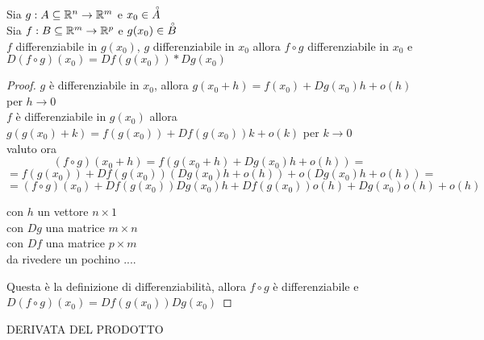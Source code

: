 \begin{proposition}
	\label{prop:deriv_funz_comp}
	Sia $g: A\subseteq \mathbb{R}^n \to \mathbb{R}^m$ e $x_0\in\accentset{\circ}{A}$\\
	Sia $f: B\subseteq \mathbb{R}^m \to \mathbb{R}^p$ e $g(x_0)\in\accentset{\circ}{B}$\\
	$f$ differenziabile in $g(x_0)$, $g$ differenziabile in $x_0$ allora $f\circ g$ differenziabile in $x_0$ e $D(f\circ g)(x_0) = Df(g(x_0))*Dg(x_0)$
	\begin{proof}
		$g$ è differenziabile in $x_0$, allora $g(x_0+h)=f(x_0)+Dg(x_0)h+o(h)$ per $h \to 0$\\
		$f$ è differenziabile in $g(x_0)$ allora $g(g(x_0)+k)=f(g(x_0))+Df(g(x_0))k+o(k)$ per $k \to 0$\\
		valuto ora
		\[(f\circ g)(x_0+h) = f(g(x_0+h)+Dg(x_0)h+o(h)) = \]
		\[=f(g(x_0))+Df(g(x_0))(Dg(x_0)h+o(h))+o(Dg(x_0)h+o(h)) = \]
		\[=(f\circ g)(x_0) + Df(g(x_0))Dg(x_0)h+Df(g(x_0))o(h)+Dg(x_0)o(h)+o(h)\]

		con $h$ un vettore $n\times 1$\\
		con $Dg$ una matrice $m\times n$\\
		con $Df$ una matrice $p\times m$\\

		da rivedere un pochino ....

		Questa è la definizione di differenziabilità, allora $f\circ g$ è differenziabile e $D(f\circ g)(x_0) = Df(g(x_0))Dg(x_0)$
	\end{proof}
\end{proposition}
\proposition DERIVATA DEL PRODOTTO
\begin{exercise}
	\label{ex:diff_funz_comp}
\end{exercise}

